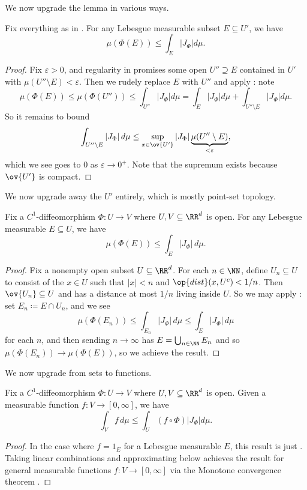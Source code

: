 \documentclass[../notes.tex]{subfiles}
\begin{document}
We now upgrade the lemma in various ways.
\begin{lemma} \label{lem:bound-change-vars-borel}
	Fix everything as in . For any Lebesgue measurable subset $E\subseteq U'$, we have
	\[\mu(\Phi(E))\le\int_E\left|J_\Phi\right|d\mu.\]
\end{lemma}
\begin{proof}
	Fix $\varepsilon>0$, and regularity in  promises some open $U''\supseteq E$ contained in $U'$ with $\mu(U''\setminus E)<\varepsilon$. Then we rudely replace $E$ with $U''$ and apply : note
	\[\mu(\Phi(E))\le\mu(\Phi(U''))\le\int_{U''}\left|J_\Phi\right|d\mu=\int_E\left|J_\Phi\right|d\mu+\int_{U''\setminus E}\left|J_\Phi\right|d\mu.\]
	So it remains to bound
	\[\int_{U''\setminus E}\left|J_\Phi\right|d\mu\le\sup_{x\in\ov{U'}}\left|J_\Phi\right|\underbrace{\mu(U''\setminus E)}_{<\varepsilon},\]
	which we see goes to $0$ as $\varepsilon\to0^+$. Note that the supremum exists because $\ov{U'}$ is compact.
\end{proof}
We now upgrade away the $U'$ entirely, which is mostly point-set topology.
\begin{lemma} \label{lem:bound-change-vars-borel-general}
	Fix a $C^1$-diffeomorphism $\Phi\colon U\to V$ where $U,V\subseteq\RR^d$ is open. For any Lebesgue measurable $E\subseteq U$, we have
	\[\mu(\Phi(E))\le\int_E\left|J_\Phi\right|\,d\mu.\]
\end{lemma}
\begin{proof}
	Fix a nonempty open subset $U\subseteq\RR^d$. For each $n\in\NN$, define $U_n\subseteq U$ to consist of the $x\in U$ such that $\left|x\right|<n$ and $\op{dist}(x,U^c)<1/n$. Then $\ov{U_n}\subseteq U$ and has a distance at most $1/n$ living inside $U$. So we may apply : set $E_n\coloneqq E\cap U_n$, and we see
	\[\mu(\Phi(E_n))\le\int_{E_n}\left|J_\Phi\right|\,d\mu\le\int_E\left|J_\Phi\right|\,d\mu\]
	for each $n$, and then sending $n\to\infty$ has $E=\bigcup_{n\in\NN}E_n$ and so $\mu(\Phi(E_n))\to\mu(\Phi(E))$, so we achieve the result.
\end{proof}
We now upgrade from sets to functions.
\begin{lemma} \label{lem:bound-change-vars-func}
	Fix a $C^1$-diffeomorphism $\Phi\colon U\to V$ where $U,V\subseteq\RR^d$ is open. Given a measurable function $f\colon V\to[0,\infty]$, we have
	\[\int_Vf\,d\mu\le\int_U(f\circ\Phi)\left|J_\Phi\right|d\mu.\]
\end{lemma}
\begin{proof}
	In the case where $f=1_E$ for a Lebesgue measurable $E$, this result is just . Taking linear combinations and approximating below achieves the result for general measurable functions $f\colon V\to[0,\infty]$ via the Monotone convergence theorem \cite[Theorem~9.18]{elber-top}.
\end{proof}
\end{document}
